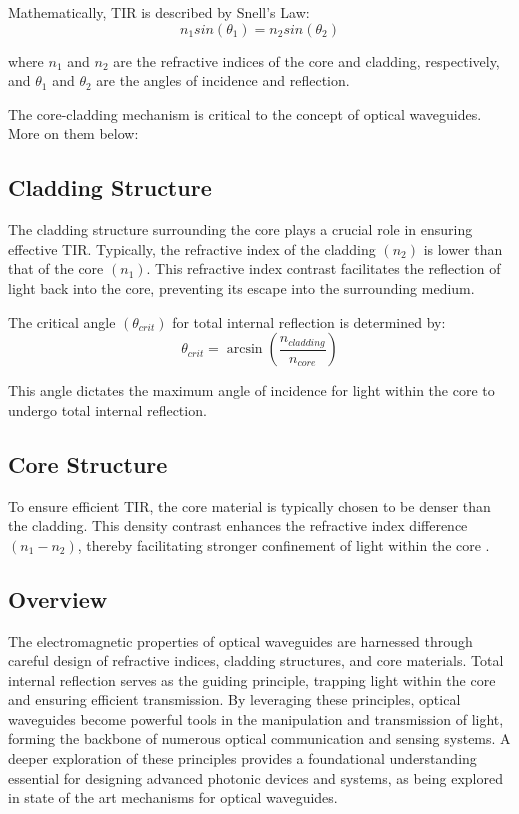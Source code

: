 \documentclass[10pt]{article}
\begin{document}
Mathematically, TIR is described by Snell's Law:
\begin{equation}
    n_{1} sin(\theta_{1}) = n_{2} sin(\theta_{2})
\end{equation}

where $n_{1}$ and $n_{2}$ are the refractive indices of the core and cladding, respectively, and $\theta_{1}$ and $\theta_{2}$ are 
the angles of incidence and reflection.

The core-cladding mechanism is critical to the concept of optical waveguides. More on them below:

\subsection{Cladding Structure}

The cladding structure surrounding the core plays a crucial role in ensuring effective TIR. Typically, the refractive index of the cladding
$(n_2)$ is lower than that of the core $(n_1)$. This refractive index contrast facilitates the reflection of light back into the core, preventing its escape into the surrounding medium.

The critical angle $(\theta_{crit})$ for total internal reflection is determined by:
\begin{equation}
    \theta_{crit} = \arcsin(\frac{n_{cladding}}{n_{core}})
\end{equation}

This angle dictates the maximum angle of incidence for light within the core to undergo total internal reflection.

\subsection{Core Structure}
To ensure efficient TIR, the core material is typically chosen to be denser than the cladding. This density contrast enhances the refractive index difference $(n_1 - n_2)$,
thereby facilitating stronger confinement of light within the core \cite{ref04}.

\subsection{Overview}
The electromagnetic properties of optical waveguides are harnessed through careful design of refractive indices, cladding structures, and core materials. 
Total internal reflection serves as the guiding principle, trapping light within the core and ensuring efficient transmission. 
By leveraging these principles, optical waveguides become powerful tools in the manipulation and transmission of light, 
forming the backbone of numerous optical communication and sensing systems. A deeper exploration of these principles provides a foundational understanding essential for designing advanced photonic 
devices and systems, as being explored in state of the art mechanisms for optical waveguides.
\end{document}
